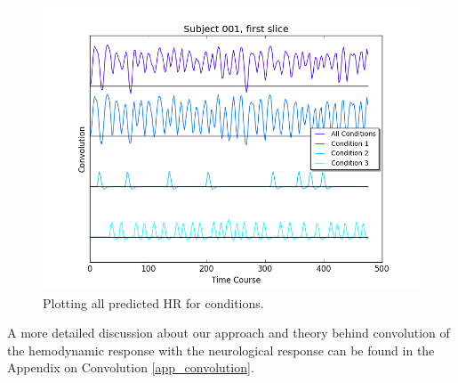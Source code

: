 \begin{figure}[ht]
\centering
\includegraphics[scale=.5]{../images/all_cond_time}  
\caption{Plotting all predicted HR for conditions.}
\label{fig:all_cond_time}
\end{figure}

A more detailed discussion about our approach and theory behind convolution 
of the hemodynamic response with the neurological response can be found 
in the Appendix on Convolution \ref{app_convolution}.

